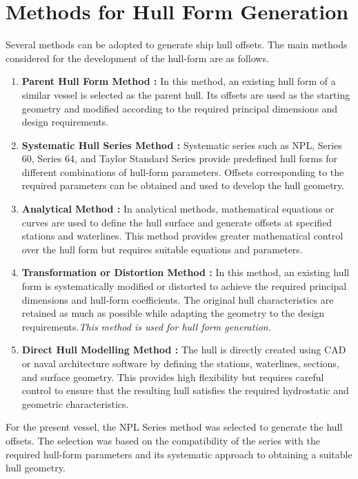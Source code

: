\documentclass[12pt,a4paper,twoside]{report}
\begin{document}
\section{Methods for Hull Form Generation}
Several methods can be adopted to generate ship hull offsets. The main methods considered for the development of the hull-form are as follows.
\begin{enumerate}[\alph*)]
    \item \textbf{Parent Hull Form Method : }In this method, an existing hull form of a similar vessel is selected as the parent hull. Its offsets are used as the starting geometry and modified according to the required principal dimensions and design requirements.
    \item \textbf{Systematic Hull Series Method : }Systematic series such as NPL, Series 60, Series 64, and Taylor Standard Series provide predefined hull forms for different combinations of hull-form parameters. Offsets corresponding to the required parameters can be obtained and used to develop the hull geometry.
    \item \textbf{Analytical Method : }In analytical methods, mathematical equations or curves are used to define the hull surface and generate offsets at specified stations and waterlines. This method provides greater mathematical control over the hull form but requires suitable equations and parameters.
    \item \textbf{Transformation or Distortion Method : }In this method, an existing hull form is systematically modified or distorted to achieve the required principal dimensions and hull-form coefficients. The original hull characteristics are retained as much as possible while adapting the geometry to the design requirements.\textit{This method is used for hull form generation.}
    \item \textbf{Direct Hull Modelling Method : }The hull is directly created using CAD or naval architecture software by defining the stations, waterlines, sections, and surface geometry. This provides high flexibility but requires careful control to ensure that the resulting hull satisfies the required hydrostatic and geometric characteristics.
\end{enumerate}
\vspace{\baselineskip}\par\noindent For the present vessel, the NPL Series method was selected to generate the hull offsets. The selection was based on the compatibility of the series with the required hull-form parameters and its systematic approach to obtaining a suitable hull geometry.
\end{document}
